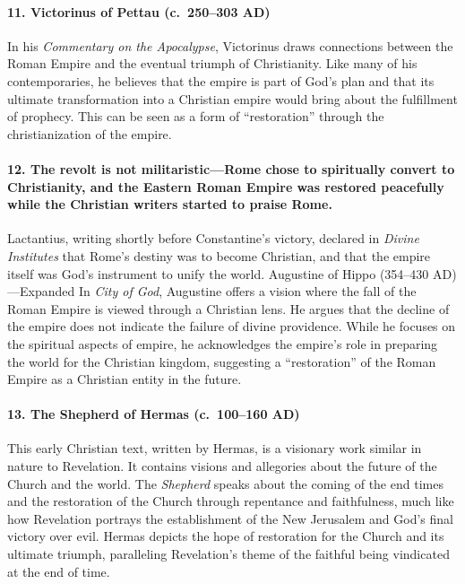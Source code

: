 \paragraph{11.
Victorinus of Pettau (c.~250--303 AD)}\label{par:victorinus-of-pettau-c.-250303-ad}

In his \emph{Commentary on the Apocalypse}, Victorinus draws connections between the Roman Empire and the eventual triumph of Christianity.
Like many of his contemporaries, he believes that the empire is part of God's plan and that its ultimate transformation into a Christian empire would bring about the fulfillment of prophecy.
This can be seen as a form of ``restoration'' through the christianization of the empire.

\paragraph{12.
The revolt is not militaristic---Rome chose to spiritually convert to Christianity, and the Eastern Roman Empire was restored peacefully while the Christian writers started to praise Rome.}\label{par:the-revolt-is-not-militaristic-rome-chose-to-spiritually-convert-to-christianity-and-the-eastern-roman-empire-was-restored-peacefully-while-the-christian-writers-started-to-praise-rome.}

Lactantius, writing shortly before Constantine’s victory, declared in \emph{Divine Institutes} that Rome’s destiny was to become Christian, and that the empire itself was God’s instrument to unify the world.
Augustine of Hippo (354--430 AD)---Expanded In \emph{City of God}, Augustine offers a vision where the fall of the Roman Empire is viewed through a Christian lens.
He argues that the decline of the empire does not indicate the failure of divine providence.
While he focuses on the spiritual aspects of empire, he acknowledges the empire's role in preparing the world for the Christian kingdom, suggesting a ``restoration'' of the Roman Empire as a Christian entity in the future.

\paragraph{13.
The Shepherd of Hermas (c.~100--160 AD)}\label{par:the-shepherd-of-hermas-c.-100-160-ad}

This early Christian text, written by Hermas, is a visionary work similar in nature to Revelation.
It contains visions and allegories about the future of the Church and the world.
The \emph{Shepherd} speaks about the coming of the end times and the restoration of the Church through repentance and faithfulness, much like how Revelation portrays the establishment of the New Jerusalem and God's final victory over evil.
Hermas depicts the hope of restoration for the Church and its ultimate triumph, paralleling Revelation's theme of the faithful being vindicated at the end of time.

